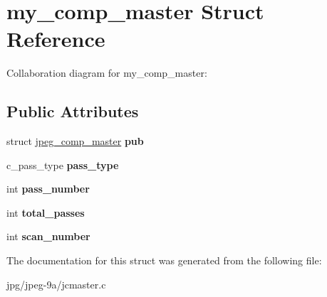 \hypertarget{structmy__comp__master}{\section{my\+\_\+comp\+\_\+master Struct Reference}
\label{structmy__comp__master}
}


Collaboration diagram for my\+\_\+comp\+\_\+master\+:
\subsection*{Public Attributes}
\begin{DoxyCompactItemize}
\item 
\hypertarget{structmy__comp__master_a92f91e2f4b79fd0e6ae36f24d8f455f0}{struct \hyperlink{structjpeg__comp__master}{jpeg\+\_\+comp\+\_\+master} {\bfseries pub}}\label{structmy__comp__master_a92f91e2f4b79fd0e6ae36f24d8f455f0}

\item 
\hypertarget{structmy__comp__master_ab153ff271327de71553b428d057e991b}{c\+\_\+pass\+\_\+type {\bfseries pass\+\_\+type}}\label{structmy__comp__master_ab153ff271327de71553b428d057e991b}

\item 
\hypertarget{structmy__comp__master_a08c52f446296c1890808382af30ae43d}{int {\bfseries pass\+\_\+number}}\label{structmy__comp__master_a08c52f446296c1890808382af30ae43d}

\item 
\hypertarget{structmy__comp__master_abc21ff7e11e64247ad8ff68ad819e9fc}{int {\bfseries total\+\_\+passes}}\label{structmy__comp__master_abc21ff7e11e64247ad8ff68ad819e9fc}

\item 
\hypertarget{structmy__comp__master_a85aabce3d888eccfaf21eeb8c5cc8606}{int {\bfseries scan\+\_\+number}}\label{structmy__comp__master_a85aabce3d888eccfaf21eeb8c5cc8606}

\end{DoxyCompactItemize}


The documentation for this struct was generated from the following file\+:\begin{DoxyCompactItemize}
\item 
jpg/jpeg-\/9a/jcmaster.\+c\end{DoxyCompactItemize}
